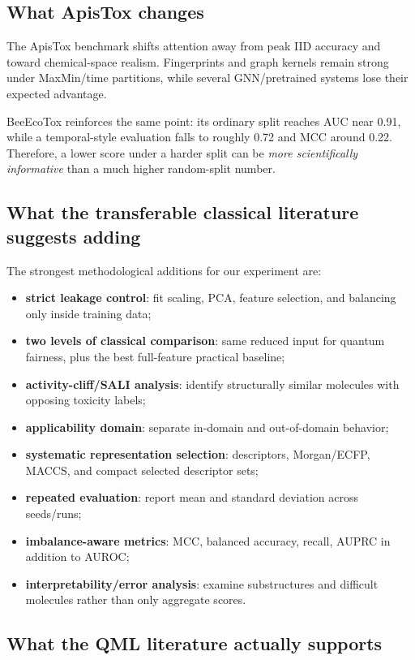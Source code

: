 \documentclass[11pt]{article}
\begin{document}
\subsection{What ApisTox changes}

The ApisTox benchmark shifts attention away from peak IID accuracy and toward chemical-space realism. Fingerprints and graph kernels remain strong under MaxMin/time partitions, while several GNN/pretrained systems lose their expected advantage.

BeeEcoTox reinforces the same point: its ordinary split reaches AUC near 0.91, while a temporal-style evaluation falls to roughly 0.72 and MCC around 0.22. Therefore, a lower score under a harder split can be \emph{more scientifically informative} than a much higher random-split number.

\subsection{What the transferable classical literature suggests adding}

The strongest methodological additions for our experiment are:
\begin{itemize}
    \item \textbf{strict leakage control}: fit scaling, PCA, feature selection, and balancing only inside training data;
    \item \textbf{two levels of classical comparison}: same reduced input for quantum fairness, plus the best full-feature practical baseline;
    \item \textbf{activity-cliff/SALI analysis}: identify structurally similar molecules with opposing toxicity labels;
    \item \textbf{applicability domain}: separate in-domain and out-of-domain behavior;
    \item \textbf{systematic representation selection}: descriptors, Morgan/ECFP, MACCS, and compact selected descriptor sets;
    \item \textbf{repeated evaluation}: report mean and standard deviation across seeds/runs;
    \item \textbf{imbalance-aware metrics}: MCC, balanced accuracy, recall, AUPRC in addition to AUROC;
    \item \textbf{interpretability/error analysis}: examine substructures and difficult molecules rather than only aggregate scores.
\end{itemize}

\subsection{What the QML literature actually supports}
\end{document}
